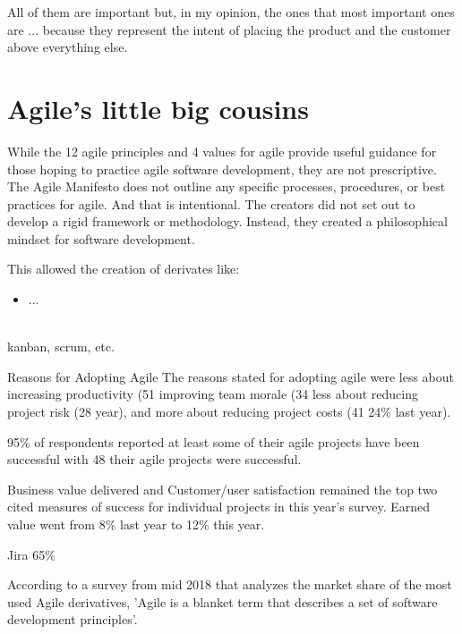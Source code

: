 	All of them are important but, in my opinion, the ones that most important ones are ... because they represent the intent of placing the product and the customer above everything else.

\section{Agile's little big cousins}
	
	While the 12 agile principles and 4 values for agile provide useful guidance for those hoping to practice agile software development, they are not prescriptive.
	The Agile Manifesto does not outline any specific processes, procedures, or best practices for agile. And that is intentional. The creators did not set out to develop a rigid framework or methodology. Instead, they created a philosophical mindset for software development.

	This allowed the creation of derivates like:
	\begin{itemize}
		\item ...
	\end{itemize}\\
	kanban, scrum, etc.


Reasons for Adopting Agile
The reasons stated for adopting agile were less about increasing
productivity (51%
improving team morale (34%
less about reducing project risk (28%
year), and more about reducing project costs (41%
24\% last year).

95\% of respondents reported at least some of their agile projects have been successful with 48%
their agile projects were successful.

Business value delivered
and Customer/user
satisfaction remained the
top two cited measures
of success for individual
projects in this year’s
survey. Earned value went
from 8\% last year to 12\%
this year.

Jira 65\%

	According to a survey from mid 2018 that analyzes the market share of the most used Agile derivatives, 'Agile is a blanket term that describes a set of software development principles'.
	



